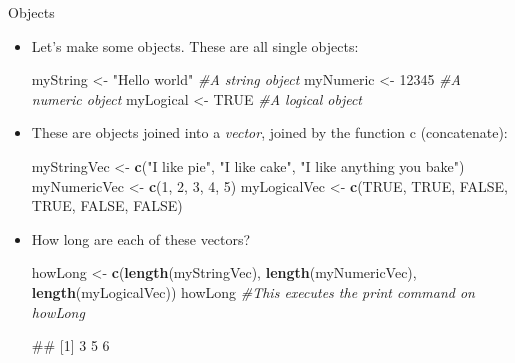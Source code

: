\documentclass[
  ignorenonframetext,
  aspectratio=169]{beamer}
\newenvironment{Shaded}{\begin{snugshade}}{\end{snugshade}}
\newcommand{\CommentTok}[1]{\textcolor[rgb]{0.56,0.35,0.01}{\textit{#1}}}
\newcommand{\ConstantTok}[1]{\textcolor[rgb]{0.56,0.35,0.01}{#1}}
\newcommand{\DecValTok}[1]{\textcolor[rgb]{0.00,0.00,0.81}{#1}}
\newcommand{\FunctionTok}[1]{\textcolor[rgb]{0.13,0.29,0.53}{\textbf{#1}}}
\newcommand{\NormalTok}[1]{#1}
\newcommand{\OtherTok}[1]{\textcolor[rgb]{0.56,0.35,0.01}{#1}}
\newcommand{\StringTok}[1]{\textcolor[rgb]{0.31,0.60,0.02}{#1}}
\let\oldShaded\Shaded %
\let\endoldShaded\endShaded
\renewenvironment{Shaded}{\footnotesize\oldShaded}{\endoldShaded}
\let\oldverbatim\verbatim %Change fontsize of code chunk output
\let\endoldverbatim\endverbatim
\renewenvironment{verbatim}{\footnotesize\oldverbatim}{\endoldverbatim}
\begin{document}
\begin{frame}[fragile]{Objects}
\protect\hypertarget{objects}{}
\begin{itemize}[<+->]
\item
  Let's make some objects. These are all single objects:

\begin{Shaded}
\begin{Highlighting}[]
\NormalTok{myString }\OtherTok{\textless{}{-}} \StringTok{"Hello world"}  \CommentTok{\#A string object}
\NormalTok{myNumeric }\OtherTok{\textless{}{-}} \DecValTok{12345}  \CommentTok{\#A numeric object}
\NormalTok{myLogical }\OtherTok{\textless{}{-}} \ConstantTok{TRUE}  \CommentTok{\#A logical object}
\end{Highlighting}
\end{Shaded}
\item
  These are objects joined into a \emph{vector}, joined by the function
  c (concatenate):

\begin{Shaded}
\begin{Highlighting}[]
\NormalTok{myStringVec }\OtherTok{\textless{}{-}} \FunctionTok{c}\NormalTok{(}\StringTok{"I like pie"}\NormalTok{, }\StringTok{"I like cake"}\NormalTok{, }\StringTok{"I like anything you bake"}\NormalTok{)}
\NormalTok{myNumericVec }\OtherTok{\textless{}{-}} \FunctionTok{c}\NormalTok{(}\DecValTok{1}\NormalTok{, }\DecValTok{2}\NormalTok{, }\DecValTok{3}\NormalTok{, }\DecValTok{4}\NormalTok{, }\DecValTok{5}\NormalTok{)}
\NormalTok{myLogicalVec }\OtherTok{\textless{}{-}} \FunctionTok{c}\NormalTok{(}\ConstantTok{TRUE}\NormalTok{, }\ConstantTok{TRUE}\NormalTok{, }\ConstantTok{FALSE}\NormalTok{, }\ConstantTok{TRUE}\NormalTok{, }\ConstantTok{FALSE}\NormalTok{, }\ConstantTok{FALSE}\NormalTok{)}
\end{Highlighting}
\end{Shaded}
\item
  How long are each of these vectors?

\begin{Shaded}
\begin{Highlighting}[]
\NormalTok{howLong }\OtherTok{\textless{}{-}} \FunctionTok{c}\NormalTok{(}\FunctionTok{length}\NormalTok{(myStringVec), }\FunctionTok{length}\NormalTok{(myNumericVec), }\FunctionTok{length}\NormalTok{(myLogicalVec))}
\NormalTok{howLong  }\CommentTok{\#This executes the \textasciigrave{}print\textasciigrave{} command on \textasciigrave{}howLong\textasciigrave{}}
\end{Highlighting}
\end{Shaded}

\begin{verbatim}
## [1] 3 5 6
\end{verbatim}
\end{itemize}
\end{frame}
\end{document}
